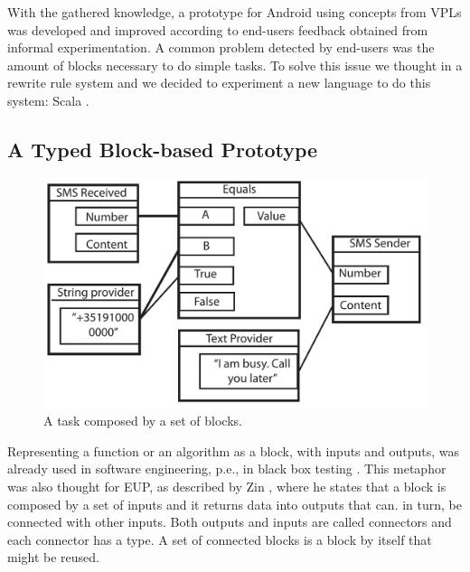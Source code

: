 \documentclass[9pt,a4paper]{extarticle}
\begin{document}
\begin{multicols}{2}
With the gathered knowledge, a prototype for Android using concepts from VPLs was developed and improved according to end-users feedback obtained from informal experimentation. 
A common problem detected by end-users was the amount of blocks necessary to do simple tasks. To solve this issue we thought in a rewrite rule system and we decided to experiment a new language to do this system: Scala \cite{ProgrammingScala}.

\subsection{A Typed Block-based Prototype}


\begin{figure}[H]
\centerline{\includegraphics[scale=.43]{block_example.pdf}}
\label{fig:block}
\caption{A task composed by a set of blocks.} 
\end{figure}

Representing a function or an algorithm as a block, with inputs and outputs, was already used in software engineering, p.e., in black box testing \cite{BlackBoxTesting}. This metaphor was also thought for EUP, as described by Zin \cite{Zin2011}, where he states that a block is composed by a set of inputs and it returns data into outputs that can. in turn, be connected with other inputs.
Both outputs and inputs are called connectors and each connector has a type. A set of connected blocks is a block by itself that might be reused. 


\end{multicols}
\end{document}
